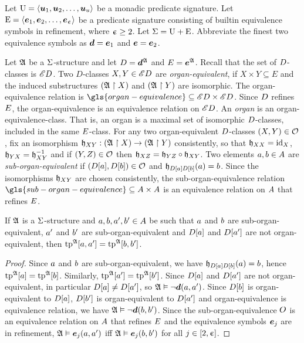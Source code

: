Let $\mathrm{U} = \left\langle \bm{u}_{1},\bm{u}_{2},\dots,\bm{u}_{u} \right\rangle$ be a monadic predicate signature.
Let $\mathrm{E} = \left\langle \bm{e}_{1},\bm{e}_{2},\dots,\bm{e}_{\upepsilon} \right\rangle$ be a predicate signature consisting
of builtin equivalence symbols in refinement, where $\upepsilon \geq 2$.
Let $\mathrm{\Sigma} = \mathrm{U} + \mathrm{E}$.
Abbreviate the finest two equivalence symbols as $\bm{d} = \bm{e}_{1}$ and $\bm{e} =
\bm{e}_{2}$.

\begin{definition}
Let $\mathfrak{A}$ be a $\mathrm{\Sigma}$-structure and let $D = \bm{d}^{\mathfrak{A}}$ and
$E = \bm{e}^{\mathfrak{A}}$.
Recall that the set of $D$-classes is ${\mathscr{E}D}$.
Two $D$-classes $X, Y \in {\mathscr{E}D}$ are \emph{organ-equivalent},
if $X \times Y \subseteq E$ and the induced substructures 
$(\mathfrak{A} \restriction X)$ and $(\mathfrak{A} \restriction Y)$ are isomorphic.
The organ-equivalence relation is
$\gls{organ-equivalence} \subseteq \domXX{\Ecl\relD}$.
Since $D$ refines $E$, the organ-equivalence is an equivalence relation
on ${\mathscr{E}D}$.
An \emph{organ} is an organ-equivalence-class. That is, an organ
is a maximal set of isomorphic $D$-classes, included in the same
$E$-class.
For any two organ-equivalent $D$-classes $(X, Y) \in \mathcal{O}$,
fix an isomorphism
$\mathfrak{h}_{XY} : (\mathfrak{A} \restriction X) \to (\mathfrak{A} \restriction Y)$
consistently, so that $\mathfrak{h}_{XX} = \operatorname{id}_{X}$,
$\mathfrak{h}_{YX} = \mathfrak{h}_{XY}^{-1}$
and if $(Y, Z) \in \mathcal{O}$ then
$\mathfrak{h}_{XZ} = \mathfrak{h}_{YZ} \circ \mathfrak{h}_{XY}$.
Two elements $a, b \in A$ are \emph{sub-organ-equivalent}
if $(D[a], D[b]) \in \mathcal{O}$ and
$\mathfrak{h}_{D[a]D[b]}(a) = b$.
Since the isomorphisms $\mathfrak{h}_{XY}$ are chosen consistently, the
sub-organ-equivalence relation
$\gls{sub-organ-equivalence} \subseteq \domAA$ is an equivalence relation on
$A$ that refines $E$.
\end{definition}

\begin{remark}\label{rem:twovar-same-organ-tp2}
If $\mathfrak{A}$ is a $\mathrm{\Sigma}$-structure and $a, b, {a'}, {b'} \in A$ be such
that $a$ and $b$ are sub-organ-equivalent, ${a'}$ and ${b'}$ are
sub-organ-equivalent and $D[a]$ and $D[{a'}]$ are not
organ-equivalent, then $\operatorname{tp}^{\mathfrak{A}}[a,{a'}] = \operatorname{tp}^{\mathfrak{A}}[b,{b'}]$.
\end{remark}
\begin{proof}
Since $a$ and $b$ are sub-organ-equivalent, we have
$\mathfrak{h}_{D[a]D[b]}(a) = b$,
hence $\operatorname{tp}^{\mathfrak{A}}[a] = \operatorname{tp}^{\mathfrak{A}}[b]$.
Similarly, $\operatorname{tp}^{\mathfrak{A}}[{a'}] = \operatorname{tp}^{\mathfrak{A}}[{b'}]$.
Since $D[a]$ and $D[{a'}]$ are not organ-equivalent,
in particular $D[a] \neq D[{a'}]$,
so $\mathfrak{A} \vDash \lnot \bm{d}(a,{a'})$.
Since $D[b]$ is organ-equivalent to $D[a]$, $D[{b'}]$ is
organ-equivalent to $D[{a'}]$ and organ-equivalence is equivalence relation,
we have $\mathfrak{A} \vDash \lnot \bm{d}(b, {b'})$.
Since the sub-organ-equivalence $O$ is an equivalence relation on $A$
that refines $E$ and the equivalence symbols $\bm{e}_{j}$ are in refinement,
$\mathfrak{A} \vDash \bm{e}_{j}(a, {a'})$  iff $\mathfrak{A} \vDash \bm{e}_{j}(b, {b'})$ for all 
$j \in [2,\upepsilon]$.
\end{proof}

